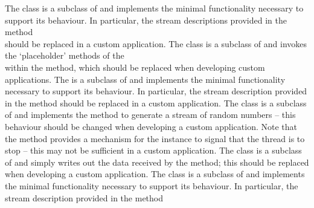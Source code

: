 The  class is a subclass of
 and implements the minimal functionality necessary
to support its behaviour.
In particular, the stream descriptions provided in the method\\
 should be replaced in a custom application.
The  class is a subclass of
 and invokes the `placeholder' methods of the\\
 within the  method, which should
be replaced when developing custom applications.
The  is a subclass of
 and implements the minimal functionality necessary
to support its behaviour.
In particular, the stream description provided in the method
 should be replaced in a custom application.
The  class is a subclass of
 and implements the  method to generate a stream of
random numbers -- this behaviour should be changed when developing a custom application.
Note that the method  provides a mechanism for the
 instance to signal that the thread is to
stop -- this may not be sufficient in a custom application.
The  class is a subclass of
 and simply writes out the data received by the
 method; this should be replaced when developing a custom application.
The  class is a subclass of
 and implements the minimal functionality necessary
to support its behaviour.
In particular, the stream description provided in the method
